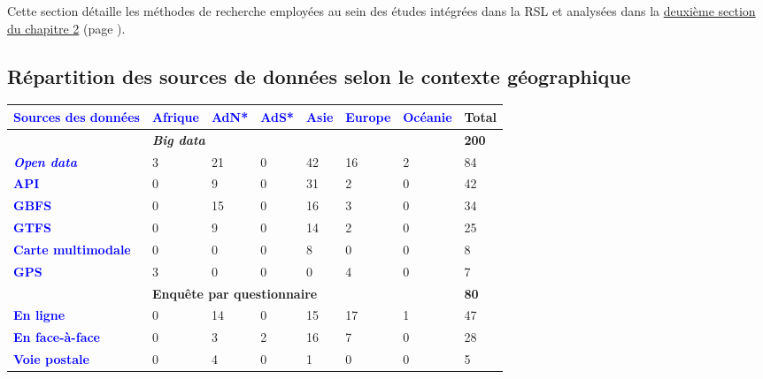 Cette section détaille les méthodes de recherche employées au sein des études intégrées dans la \acrshort{RSL} et analysées dans la \hyperref[Évaluation des méthodes de collecte de données]{deuxième section du chapitre 2} (page \pageref{Évaluation des méthodes de collecte de données}).\par

\subsection{Répartition des sources de données selon le contexte géographique}
    \label{donnees-ouvertes:rsl_publications_sources_donnees_par_continent}

        \begin{table}[h]
        \centering
        \renewcommand{\arraystretch}{1.5}
        \begin{tabular}{p{3.9cm}p{1.1cm}p{1.1cm}p{1.1cm}p{1.1cm}p{1.1cm}p{1.1cm}p{1.1cm}}
        \hline
    \rule{0pt}{15pt} \textcolor{blue}{\textbf{Sources des données}} & \textcolor{blue}{\textbf{Afrique}} & \textcolor{blue}{\textbf{AdN*}} & \textcolor{blue}{\textbf{AdS*}} & \textcolor{blue}{\textbf{Asie}} & \textcolor{blue}{\textbf{Europe}} & \textcolor{blue}{\textbf{Océanie}} & \textbf{Total}
    \\
            \hline
        & \multicolumn{6}{l}{\textbf{\textsl{Big data}}} & \textbf{200}\\
        \textcolor{blue}{\textbf{\textsl{Open data}}} & 3 & 21 & 0 & 42 & 16 & 2 & 84\\
        \textcolor{blue}{\textbf{API}} & 0 & 9 & 0 & 31 & 2 & 0 & 42\\
        \textcolor{blue}{\textbf{GBFS}} & 0 & 15 & 0 & 16 & 3 & 0 & 34\\
        \textcolor{blue}{\textbf{GTFS}} & 0 & 9 & 0 & 14 & 2 & 0 & 25\\
        \textcolor{blue}{\textbf{Carte multimodale}} & 0 & 0 & 0 & 8 & 0 & 0 & 8\\
        \textcolor{blue}{\textbf{GPS}} & 3 & 0 & 0 & 0 & 4 & 0 & 7\\
            \hline
        & \multicolumn{6}{l}{\textbf{Enquête par questionnaire}} & \textbf{80}\\
        \textcolor{blue}{\textbf{En ligne}} & 0 & 14 & 0 & 15 & 17 & 1 & 47\\
        \textcolor{blue}{\textbf{En face-à-face}} & 0 & 3 & 2 & 16 & 7 & 0 & 28\\
        \textcolor{blue}{\textbf{Voie postale}} & 0 & 4 & 0 & 1 & 0 & 0 & 5\\

\end{tabular}
\end{table}
